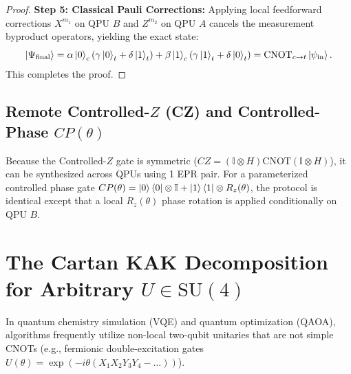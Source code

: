 \begin{proof}
\textbf{Step 5: Classical Pauli Corrections:}
Applying local feedforward corrections $X^{m_1}$ on QPU $B$ and $Z^{m_2}$ on QPU $A$ cancels the measurement byproduct operators, yielding the exact state:
\begin{equation}
    \ket{\Psi_{\text{final}}} = \alpha\ket{0}_c (\gamma\ket{0}_t + \delta\ket{1}_t) + \beta\ket{1}_c (\gamma\ket{1}_t + \delta\ket{0}_t) = \text{CNOT}_{c \to t} \ket{\psi_{\text{in}}}.
\end{equation}
This completes the proof.
\end{proof}

\subsection{Remote Controlled-$Z$ (CZ) and Controlled-Phase $CP(\theta)$}
Because the Controlled-$Z$ gate is symmetric ($CZ = (\mathbb{I} \otimes H) \text{CNOT} (\mathbb{I} \otimes H)$), it can be synthesized across QPUs using 1 EPR pair. For a parameterized controlled phase gate $CP(\theta) = \ket{0}\bra{0} \otimes \mathbb{I} + \ket{1}\bra{1} \otimes R_z(\theta)$, the protocol is identical except that a local $R_z(\theta)$ phase rotation is applied conditionally on QPU $B$.

\section{The Cartan KAK Decomposition for Arbitrary $U \in \text{SU}(4)$}
\label{sec:kak_cartan_synthesis}

In quantum chemistry simulation (VQE) and quantum optimization (QAOA), algorithms frequently utilize non-local two-qubit unitaries that are not simple CNOTs (e.g., fermionic double-excitation gates $U(\theta) = \exp(-i \theta (X_1 X_2 Y_3 Y_4 - \dots))$).

